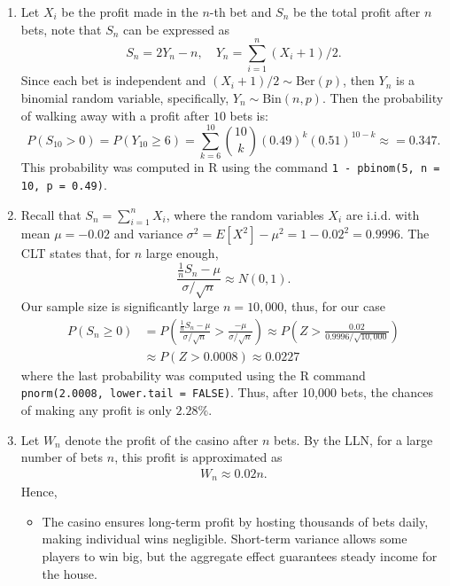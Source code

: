 \documentclass[12pt]{article}
\begin{document}
\begin{enumerate}
\begin{enumerate}
        \item Let $X_i$ be the profit made in the $n$-th bet and \( S_{n} \) be the total profit after $n$ bets, note that \(S_{n}\) can be expressed as
        $$
        S_n = 2Y_n - n,\quad Y_n = \sum_{i=1}^n(X_i + 1)/2.
        $$
        Since each bet is independent and $(X_i + 1)/2 \sim \text{Ber}(p)$, then $Y_n$ is a binomial random variable, specifically, $Y_n\sim\text{Bin}(n, p)$. Then the probability of walking away with a profit after $10$ bets is:
        \[
        P(S_{10} > 0) = P(Y_{10} \geq 6) = \sum_{k = 6}^{10} \binom{10}{k} (0.49)^k (0.51)^{10-k} \approx = 0.347.
        \]
        This probability was computed in R using the command \texttt{1 - pbinom(5, n = 10, p = 0.49)}.

        \item Recall that $S_n = \sum_{i=1}^n X_i$, where the random variables $X_i$ are i.i.d. with mean $\mu = -0.02$ and variance $\sigma^2 = E[X^2] - \mu^2 = 1 - 0.02^2 = 0.9996$. The CLT states that, for $n$ large enough,
        $$
        \frac{\frac{1}{n}S_n - \mu}{\sigma/\sqrt{n}} \approx N(0, 1).
        $$
        Our sample size is significantly large \( n = 10,000 \), thus, for our case
        \begin{align*}
            P(S_n \geq 0)
            &= P\left(\frac{\frac{1}{n}S_n - \mu}{\sigma/\sqrt{n}} > \frac{ - \mu}{\sigma/\sqrt{n}}\right) 
            \approx P\left(Z > \frac{0.02}{0.9996/\sqrt{10,000}}\right) \\
            &\approx P(Z > 0.0008) \approx 0.0227
        \end{align*}
        where the last probability was computed using the R command \texttt{pnorm(2.0008, lower.tail = FALSE)}.
        Thus, after 10,000 bets, the chances of making any profit is only $2.28\%$.
    
        \item Let $W_n$ denote the profit of the casino after $n$ bets. By the LLN, for a large number of bets $n$, this profit is approximated as
        \begin{align*}
            W_n \approx 0.02 n.
        \end{align*}
        Hence,
        \begin{itemize}
            \item[] The casino ensures long-term profit by hosting thousands of bets daily, making individual wins negligible. Short-term variance allows some players to win big, but the aggregate effect guarantees steady income for the house.
        \end{itemize}
    

\end{enumerate}
\end{enumerate}
\end{document}
